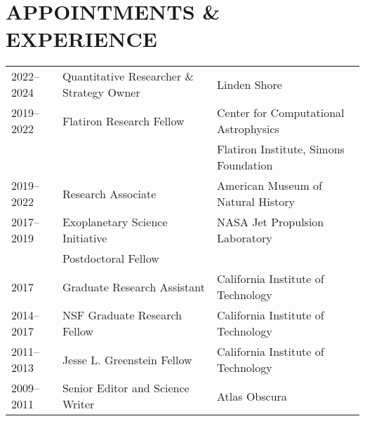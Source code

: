 \section{\large APPOINTMENTS \& EXPERIENCE}
\begin{tabular}{lll}
2022--2024 & Quantitative Researcher \& Strategy Owner & Linden Shore\\
2019--2022 & Flatiron Research Fellow & Center for Computational Astrophysics\\
&  & Flatiron Institute, Simons Foundation \\
2019--2022 & Research Associate & American Museum of Natural History\\
2017--2019 & Exoplanetary Science Initiative & NASA Jet Propulsion Laboratory\\
 & Postdoctoral Fellow & \\
2017 & Graduate Research Assistant & California Institute of Technology\\
2014--2017 & NSF Graduate Research Fellow & California Institute of Technology\\
2011--2013 & Jesse L. Greenstein Fellow & California Institute of Technology\\
2009--2011 & Senior Editor and Science Writer & Atlas Obscura\\
\end{tabular}




